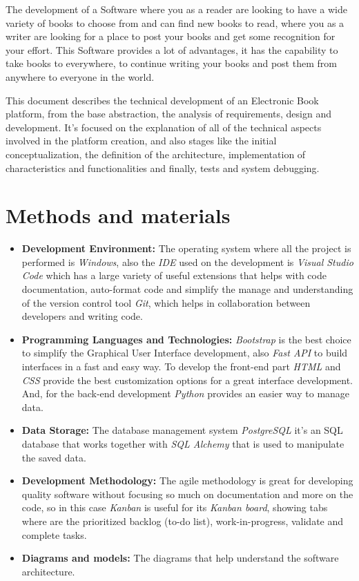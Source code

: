 \documentclass[conference]{IEEEtran}
\begin{document}
The development of a Software where you as a reader are looking to have a wide variety of books to choose from and can find new books to read, where you as a writer are looking for a place to post your books and get some recognition for your effort. This Software provides a lot of advantages, it has the capability to take books to everywhere, to continue writing your books and post them from anywhere to everyone in the world.

This document describes the technical development of an Electronic Book platform, from the base abstraction, the analysis of requirements, design and development. It's focused on the explanation of all of the technical aspects involved in the platform creation, and also stages like the initial conceptualization, the definition of the architecture, implementation of characteristics and functionalities and finally, tests and system debugging.

\section{Methods and materials}

\begin{itemize}
\item \textbf{Development Environment:} The operating system where all the project is performed is \textit{Windows}, also the \textit{IDE} used on the development is \textit{Visual Studio Code} which has a large variety of useful extensions that helps with code documentation, auto-format code and simplify the manage and understanding of the version control tool \textit{Git}, which helps in collaboration between developers and writing code.
\item \textbf{Programming Languages and Technologies:} \textit{Bootstrap} is the best choice to simplify the Graphical User Interface development, also \textit{Fast API} to build interfaces in a fast and easy way. To develop the front-end part \textit{HTML} and \textit{CSS} provide the best customization options for a great interface development. And, for the back-end development \textit{Python} provides an easier way to manage data.
\item \textbf{Data Storage:} The database management system \textit{PostgreSQL} it's an SQL database that works together with \textit{SQL Alchemy} that is used to manipulate the saved data.
\item \textbf{Development Methodology:} The agile methodology is great for developing quality software without focusing so much on documentation and more on the code, so in this case \textit{Kanban} is useful for its \textit{Kanban board}, showing tabs where are the prioritized backlog (to-do list), work-in-progress, validate and complete tasks. 
\item \textbf{Diagrams and models:} The diagrams that help understand the software architecture.
\end{itemize}
\end{document}

